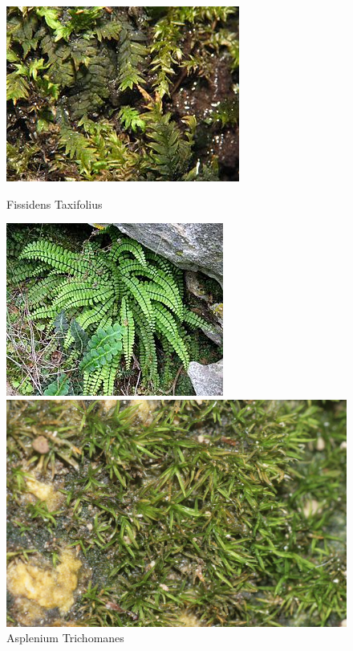 \documentclass[draft, final]{report}
\begin{document}
\begin{figure}[!ht]
    \begin{minipage}[c]{.46\linewidth}
        \centering
        \includegraphics[scale=1.5]{LateX/Images/fissidenstaxifolius.jpg}
        \caption{Fissidens Taxifolius\cite{fissidenstaxifolius}}
    \end{minipage}
    \hfill%
    \begin{minipage}[c]{.46\linewidth}
        \centering
        \includegraphics[scale=0.7]{LateX/Images/aspleniumtrichomanes.jpg}
        \caption{Asplenium Trichomanes\cite{aspleniumtrichomanes}}
    \end{minipage}
    \hfill%
    \begin{minipage}[c]{.46\linewidth}
        \centering
        \includegraphics[scale=0.15]{LateX/Images/eucladiumverticillatum.jpg}

\end{minipage}
\end{figure}
\end{document}
